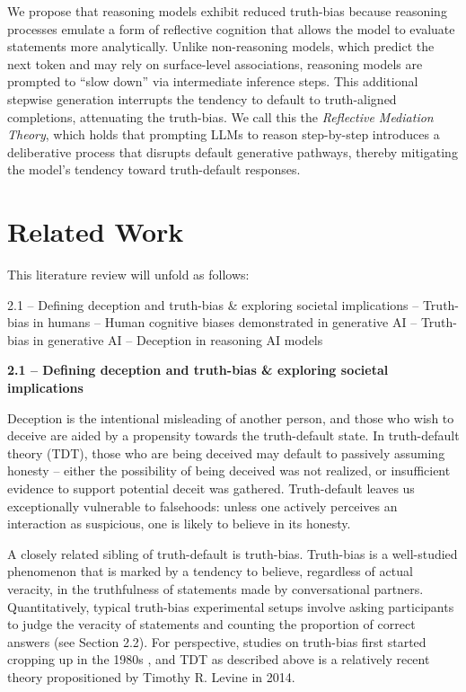 \documentclass{article}
\begin{document}
We propose that reasoning models exhibit reduced truth-bias because reasoning processes emulate a form of reflective cognition that allows the model to evaluate statements more analytically. Unlike non-reasoning models, which predict the next token and may rely on surface-level associations, reasoning models are prompted to ``slow down'' via intermediate inference steps. This additional stepwise generation interrupts the tendency to default to truth-aligned completions, attenuating the truth-bias. We call this the \textit{Reflective Mediation Theory}, which holds that prompting LLMs to reason step-by-step introduces a deliberative process that disrupts default generative pathways, thereby mitigating the model’s tendency toward truth-default responses.

\section{Related Work}

This literature review will unfold as follows:

2.1 – Defining deception and truth-bias \& exploring societal implications  – Truth-bias in humans  – Human cognitive biases demonstrated in generative AI  – Truth-bias in generative AI  – Deception in reasoning AI models \newline

\textbf{2.1 – Defining deception and truth-bias \& exploring societal implications}

Deception is the intentional misleading of another person, and those who wish to deceive are aided by a propensity towards the truth-default state. In truth-default theory (TDT), those who are being deceived may default to passively assuming honesty – either the possibility of being deceived was not realized, or insufficient evidence to support potential deceit was gathered. Truth-default leaves us exceptionally vulnerable to falsehoods: unless one actively perceives an interaction as suspicious, one is likely to believe in its honesty. \citep{levine_truth-default_2022}

A closely related sibling of truth-default is truth-bias. Truth-bias is a well-studied phenomenon that is marked by a tendency to believe, regardless of actual veracity, in the truthfulness of statements made by conversational partners. \citep{pantazi_power_2018} Quantitatively, typical truth-bias experimental setups involve asking participants to judge the veracity of statements and counting the proportion of correct answers (see Section 2.2). For perspective, studies on truth-bias first started cropping up in the 1980s \citep{mccornack_deception_1986}, and TDT as described above is a relatively recent theory propositioned by Timothy R. Levine in 2014. 
\end{document}
